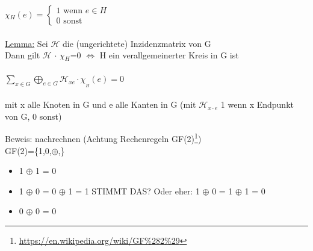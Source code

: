 {\LARGE $\chi$}$_H(e)=
	\begin{cases}
		\text{1 wenn } e \in H\\
		\text{0 sonst}
	\end{cases}
$
\\\\
\underline{Lemma:} Sei $\mathcal{H}$ die (ungerichtete) Inzidenzmatrix von G\\
Dann gilt {\large$\mathcal{H}$} $\cdot$ {\Large $\chi$}$_H$=0 $\Leftrightarrow$ H ein verallgemeinerter Kreis in G ist
\\\\
$\displaystyle \sum \limits_{x \in G} \bigoplus\limits_{e \in G} \mathcal{H}_{x e} \cdot \chi_{_H}(e)=0$\\\\
mit x alle Knoten in G und e alle Kanten in G (mit $\mathcal{H}_{x \cdot e}$ 1 wenn x Endpunkt von G, 0 sonst)

\newpage
Beweis: nachrechnen (Achtung Rechenregeln GF(2)\footnote{\url{https://en.wikipedia.org/wiki/GF\%282\%29}})\\
GF(2)=\{1,0,$\oplus$,\}
\begin{itemize}
	\item 1 $\oplus$ 1 = 0
	\item 1 $\oplus$ 0 = 0 $\oplus$ 1 = 1 \qquad STIMMT DAS? Oder eher: 1 $\oplus$ 0 = 1 $\oplus$ 1 = 0
	\item 0 $\oplus$ 0 = 0
\end{itemize}

